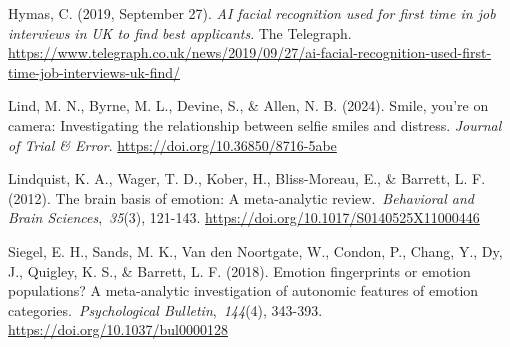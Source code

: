 \documentclass[authordate, reflection]{jote-new-article}
\begin{document}
	Hymas, C. (2019, September 27). \emph{AI facial recognition used for first time in job interviews in } \emph{UK to find best applicants}. The Telegraph. \url{https://www.telegraph.co.uk/news/2019/09/27/ai-facial-recognition-used-first-time-job-interviews-uk-find/}



	Lind, M. N., Byrne, M. L., Devine, S., \& Allen, N. B. (2024). Smile, you're on camera: Investigating the relationship between selfie smiles and distress. \emph{Journal of Trial \& Error}. \url{https://doi.org/10.36850/8716-5abe}



	Lindquist, K. A., Wager, T. D., Kober, H., Bliss-Moreau, E., \& Barrett, L. F. (2012). The brain basis of emotion: A meta-analytic review. \emph{Behavioral and Brain Sciences}, \emph{35}(3), 121-143. \url{https://doi.org/10.1017/S0140525X11000446}



	Siegel, E. H., Sands, M. K., Van den Noortgate, W., Condon, P., Chang, Y., Dy, J., Quigley, K. S., \& Barrett, L. F. (2018). Emotion fingerprints or emotion populations? A meta-analytic investigation of autonomic features of emotion categories. \emph{Psychological Bulletin}, \emph{144}(4), 343-393. \url{https://doi.org/10.1037/bul0000128}
\end{document}
